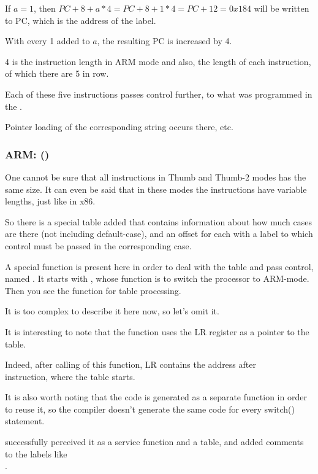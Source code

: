 If $a=1$, then $PC+8+a*4 = PC+8+1*4 = PC+12 = 0x184$ will be written to \ac{PC},
which is the address of the  label.

With every 1 added to $a$, the resulting \ac{PC} is increased by 4.

4 is the instruction length in ARM mode and also, the length of each  instruction,
of which there are 5 in row.

Each of these five  instructions passes control further, to what was programmed in the .

Pointer loading of the corresponding string occurs there, etc.

\subsubsection{ARM: \OptimizingKeilVI (\ThumbMode)}




One cannot be sure that all instructions in Thumb and Thumb-2 modes has the same size.
It can even be said that in these modes the instructions have variable lengths, just like in x86.


So there is a special table added that contains information about how much cases are there (not including 
default-case), and an offset for each with a label to which control must be passed in 
the corresponding case.


A special function is present here in order to deal with the table and pass control, \\
named . 
It starts with , whose function is to switch the processor to ARM-mode.
Then you see the function for table processing. 

It is too complex to describe it here now, so let's omit it.


It is interesting to note that the function uses the \ac{LR} register as a pointer to the table.

Indeed, after calling of this function, \ac{LR} contains the address after\\
 instruction, where the table starts.

It is also worth noting that the code is generated as a separate function in order to reuse it, 
so the compiler doesn't generate the same code for every switch() statement.

\IDA successfully perceived it as a service function and a table, and added comments to the labels like\\
.


